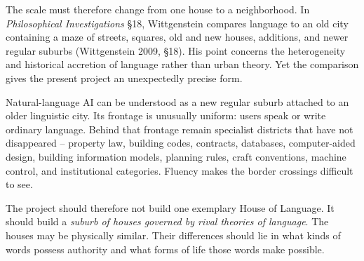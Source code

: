\documentclass[11pt]{article}
\begin{document}
The scale must therefore change from one house to a neighborhood. In \emph{Philosophical Investigations} §18, Wittgenstein compares language to an old city containing a maze of streets, squares, old and new houses, additions, and newer regular suburbs (Wittgenstein 2009, §18). His point concerns the heterogeneity and historical accretion of language rather than urban theory. Yet the comparison gives the present project an unexpectedly precise form.

Natural-language AI can be understood as a new regular suburb attached to an older linguistic city. Its frontage is unusually uniform: users speak or write ordinary language. Behind that frontage remain specialist districts that have not disappeared -- property law, building codes, contracts, databases, computer-aided design, building information models, planning rules, craft conventions, machine control, and institutional categories. Fluency makes the border crossings difficult to see.

The project should therefore not build one exemplary House of Language. It should build a \emph{suburb of houses governed by rival theories of language}. The houses may be physically similar. Their differences should lie in what kinds of words possess authority and what forms of life those words make possible.
\end{document}
